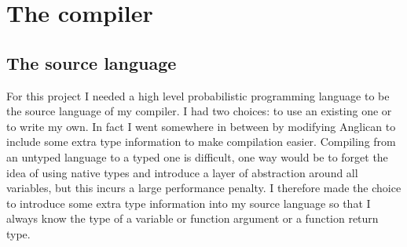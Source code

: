 \documentclass[a4paper]{article}
\begin{document}
\section{The compiler}




\subsection{The source language}

For this project I needed a high level probabilistic programming language to be the source language of my compiler. I had two choices: to use an existing one or to write my own. In fact I went somewhere in between by modifying Anglican to include some extra type information to make compilation easier. Compiling from an untyped language to a typed one is difficult, one way would be to forget the idea of using native types and introduce a layer of abstraction around all variables, but this incurs a large performance penalty. I therefore made the choice to introduce some extra type information into my source language so that I always know the type of a variable or function argument or a function return type.
\end{document}
